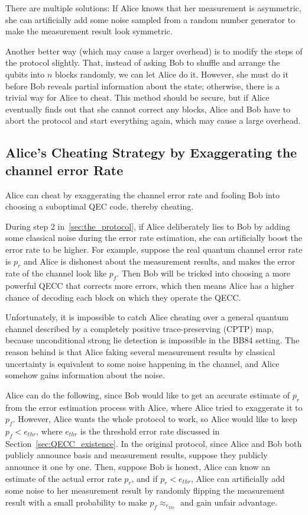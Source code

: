 \documentclass[%
 reprint,
superscriptaddress,
 amsmath,amssymb,
 aps,
]{revtex4-2}
\begin{document}
There are multiple solutions: If Alice knows that her measurement is asymmetric, she can artificially add some noise sampled from a random number generator to make the measurement result look symmetric. 

Another better way (which may cause a larger overhead) is to modify the steps of the protocol slightly. That, instead of asking Bob to shuffle and arrange the qubits into $n$ blocks randomly, we can let Alice do it. However, she must do it before Bob reveals partial information about the state; otherwise, there is a trivial way for Alice to cheat. This method should be secure, but if Alice eventually finds out that she cannot correct any blocks, Alice and Bob have to abort the protocol and start everything again, which may cause a large overhead.

\subsection{Alice's Cheating Strategy by Exaggerating the channel error Rate}
\label{sec:Alice_cheating_error_rate}

Alice can cheat by exaggerating the channel error rate and fooling Bob into choosing a suboptimal QEC code, thereby cheating.

During step 2 in~\ref{sec:the_protocol}, if Alice deliberately lies to Bob by adding some classical noise during the error rate estimation, she can artificially boost the error rate to be higher. For example, suppose the real quantum channel error rate is $p_r$ and Alice is dishonest about the measurement results, and makes the error rate of the channel look like $p_f$. Then Bob will be tricked into choosing a more powerful QECC that corrects more errors, which then means Alice has a higher chance of decoding each block on which they operate the QECC.

Unfortunately, it is impossible to catch Alice cheating over a general quantum channel described by a completely positive trace-preserving (CPTP) map, because unconditional strong lie detection is impossible in the BB84 setting. The reason behind is that Alice faking several measurement results by classical uncertainty is equivalent to some noise happening in the channel, and Alice somehow gains information about the noise.

Alice can do the following, since Bob would like to get an accurate estimate of $p_r$ from the error estimation process with Alice, where Alice tried to exaggerate it to $p_f$. However, Alice wants the whole protocol to work, so Alice would like to keep $p_f<e_{thr}$, where $e_{thr}$ is the threshold error rate discussed in Section~\ref{sec:QECC_existence}. In the original protocol, since Alice and Bob both publicly announce basis and measurement results, suppose they publicly announce it one by one. Then, suppose Bob is honest, Alice can know an estimate of the actual error rate $p_r$, and if $p_r<e_{thr}$, Alice can artificially add some noise to her measurement result by randomly flipping the measurement result with a small probability to make $p_f\approx_{e_{thr}}$ and gain unfair advantage.
\end{document}
